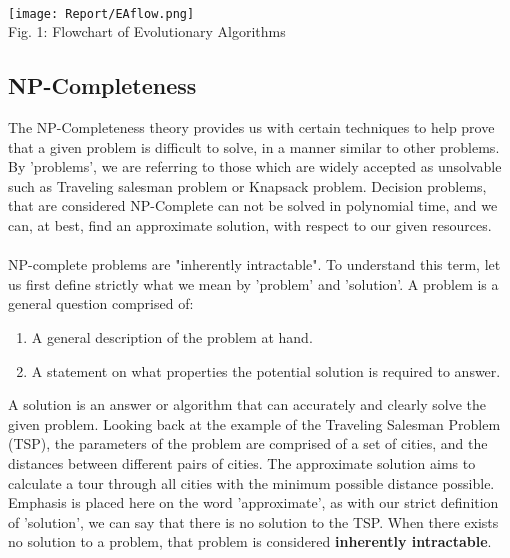 \documentclass[conference,compsoc]{IEEEtran}
\begin{document}
\paragraph{}
\begin{center}
\texttt{[image: Report/EAflow.png]}\\
    Fig. 1: Flowchart of Evolutionary Algorithms
\end{center}

\subsection{NP-Completeness}
The NP-Completeness theory provides us with certain techniques to help prove that a given problem is difficult to solve, in a manner similar to other problems. By 'problems', we are referring to those which are widely accepted as unsolvable such as Traveling salesman problem or Knapsack problem. Decision problems, that are considered NP-Complete can not be solved in polynomial time, and we can, at best, find an approximate solution, with respect to our given resources.
\\
\\
NP-complete problems are "inherently intractable". To understand this term, let us first define strictly what we mean by 'problem' and 'solution'. A problem is a general question comprised of:
\begin{enumerate}
    \item A general description of the problem at hand.
    \item A statement on what properties the potential solution is required to answer. \cite{garey_johnson_2003}
\end{enumerate}
A solution is an answer or algorithm that can accurately and clearly solve the given problem. Looking back at the example of the Traveling Salesman Problem (TSP), the parameters of the problem are comprised of a set of cities, and the distances between different pairs of cities. The approximate solution aims to calculate a tour through all cities with the minimum possible distance possible. Emphasis is placed here on the word 'approximate', as with our strict definition of 'solution', we can say that there is no solution to the TSP. When there exists no solution to a problem, that problem is considered \textbf{inherently intractable}.
\end{document}
